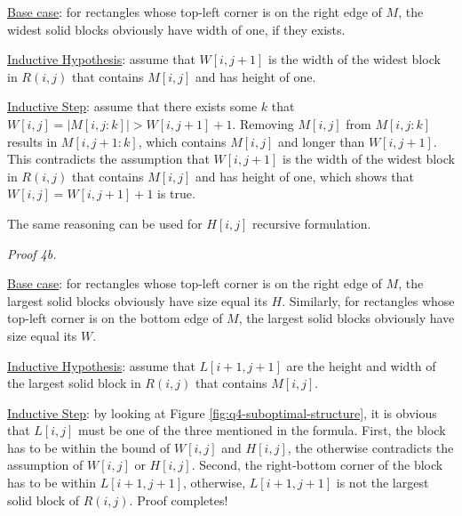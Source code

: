 \documentclass[12pt,article]{article}
\begin{document}
\underline{Base case}: for rectangles whose top-left corner is on the right edge of $M$, the widest solid blocks obviously have width of one, if they exists.

\underline{Inductive Hypothesis}: assume that $W[i,j+1]$ is the width of the widest block in $R(i,j)$ that contains $M[i,j]$ and has height of one.

\underline{Inductive Step}: assume that there exists some $k$ that $W[i,j] = |M[i,j:k]| > W[i,j+1] + 1$. Removing $M[i,j]$ from $M[i,j:k]$ results in $M[i,j+1:k]$, which contains $M[i,j]$ and longer than $W[i,j+1]$. This contradicts the assumption that $W[i,j+1]$ is the width of the widest block in $R(i,j)$ that contains $M[i,j]$ and has height of one, which shows that $W[i,j] = W[i,j+1] + 1$ is true.

The same reasoning can be used for $H[i,j]$ recursive formulation.

\textit{Proof 4b. } 

\underline{Base case}: for rectangles whose top-left corner is on the right edge of $M$, the largest solid blocks obviously have size equal its $H$. Similarly, for rectangles whose top-left corner is on the bottom edge of $M$, the largest solid blocks obviously have size equal its $W$.

\underline{Inductive Hypothesis}: assume that $L[i+1,j+1]$ are the height and width of the largest solid block in $R(i,j)$ that contains $M[i,j]$.

\underline{Inductive Step}: by looking at Figure \ref{fig:q4-suboptimal-structure}, it is obvious that $L[i,j]$ must be one of the three mentioned in the formula. First, the block has to be within the bound of $W[i,j]$ and $H[i,j]$, the otherwise contradicts the assumption of $W[i,j]$ or $H[i,j]$. Second, the right-bottom corner of the block has to be within $L[i+1,j+1]$, otherwise, $L[i+1,j+1]$ is not the largest solid block of $R(i,j)$. Proof completes!
\end{document}
